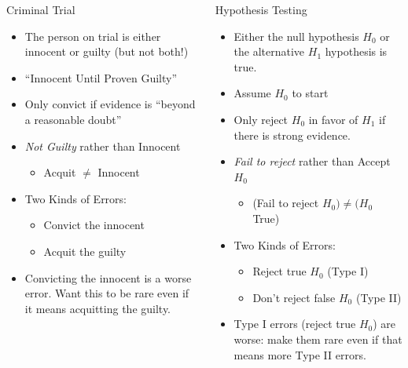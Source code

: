 \begin{frame}
\footnotesize
\begin{columns}
\begin{column}{6cm} 
   	\begin{block}{Criminal Trial}
	\begin{itemize}
		\item<1-> The person on trial is either innocent or guilty (but not both!)
		\item<2-> ``Innocent Until Proven Guilty''
		\item<3-> Only convict if evidence is ``beyond a reasonable doubt''
		\item<4-> \emph{Not Guilty} rather than Innocent
			\begin{itemize}\footnotesize
				\item<5-> Acquit $\neq$ Innocent
			\end{itemize}
		\item<6-> Two Kinds of Errors:
			\begin{itemize} \footnotesize
				\item<6-> Convict the innocent
				\item<6->  Acquit the guilty
			\end{itemize}
		\item<7-> Convicting the innocent is a worse error. Want this to be rare even if it means acquitting the guilty.	\end{itemize}
\end{block}
   
   
\end{column} 
\begin{column}{6cm} 


\begin{block}{Hypothesis Testing}
		\begin{itemize}
		\item<1-> Either the null hypothesis $H_0$ or the alternative $H_1$  hypothesis is true.
		\item<2-> Assume $H_0$ to start
		\item<3-> Only reject $H_0$ in favor of $H_1$ if there is strong evidence.
		\item<4-> \emph{Fail to reject} rather than Accept $H_0$	
		\begin{itemize} \footnotesize
			\item<5-> (Fail to reject $H_0) \neq (H_0$ True) 
		\end{itemize}
				\item<6-> Two Kinds of Errors:
			\begin{itemize} \footnotesize
				\item<6-> Reject true $H_0$ (Type I)
				\item<6-> Don't reject false $H_0$ (Type II)
			\end{itemize}
			\item<7-> Type I errors (reject true $H_0$) are worse: make them rare even if that means more Type II errors.
	\end{itemize}
\end{block}


\end{column}
\end{columns}
\end{frame}
